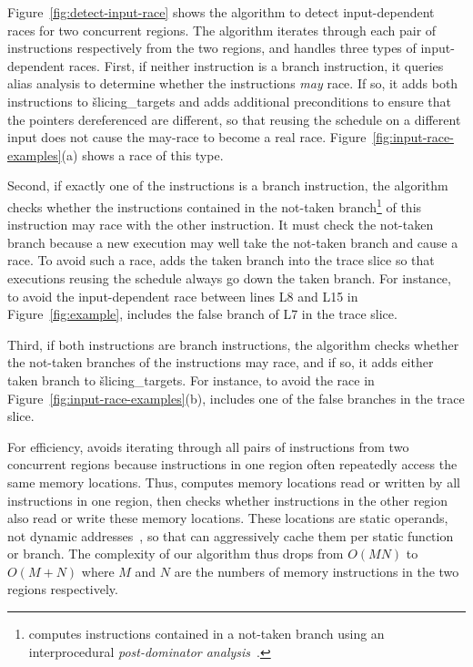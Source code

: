 Figure~\ref{fig:detect-input-race} shows the algorithm to detect
input-dependent races for two concurrent regions.  The algorithm iterates
through each pair of instructions respectively from the
two regions, and handles three types of input-dependent races.  First, if
neither instruction is a branch instruction, it queries alias analysis to
determine whether the instructions \emph{may} race.  If so, it adds both
instructions to \v{slicing\_targets} and adds additional
preconditions to ensure that the pointers dereferenced are different, so
that reusing the schedule on a different input does not cause the may-race
to become a real race.  Figure~\ref{fig:input-race-examples}(a) shows
a race of this type.

Second, if exactly one of the instructions is a branch instruction, the
algorithm checks whether the instructions contained in the not-taken
branch\footnote{\peregrine computes instructions contained in a not-taken
  branch using an interprocedural \emph{post-dominator
    analysis}~\cite{aho:dragon:06}.} of this instruction may race with the
other instruction.
It must check the not-taken branch because a new
execution may well take the not-taken branch and cause a race.  To avoid such a
race, \peregrine adds the taken branch into the trace slice so that executions
reusing the schedule always go down the taken branch.  For instance, to
avoid the input-dependent race between lines L8 and L15
in Figure~\ref{fig:example}, \peregrine includes
the false branch of L7 in the trace slice.

Third, if both instructions are branch instructions, the algorithm checks
whether the not-taken branches of the instructions may race, and if so, it
adds either taken branch to \v{slicing\_targets}.
For instance, to avoid the race in Figure~\ref{fig:input-race-examples}(b),
\peregrine includes one of the false branches in the trace slice.

For efficiency, \peregrine avoids iterating through all pairs of instructions
from two concurrent regions because instructions in one region often
repeatedly access the same memory locations.  Thus, \peregrine computes memory
locations read or written by all instructions in one region, then checks
whether instructions in the other region also read or write these memory
locations.  These locations are static operands, not dynamic
addresses~\cite{rwset:tacas08}, so that \peregrine can aggressively cache them
per static function or branch.  The complexity of our algorithm thus drops from
$O(MN)$ to $O(M+N)$ where $M$ and $N$ are the numbers of memory
instructions in the two regions respectively.

